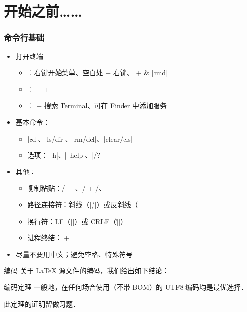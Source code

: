 \section{开始之前……}

\begin{frame}[fragile]
\frametitle{命令行基础}
\begin{itemize}
  \item 打开终端

    \begin{itemize}
      \item \faWindows{}：右键开始菜单、空白处  + 右键、 +  \& |cmd|
      \item \faLinux{}： +  + 
      \item \faApple{}： +  搜索 Terminal、可在 Finder 中添加服务
    \end{itemize}

  \item 基本命令：

    \begin{itemize}
      \item |cd|、|ls/dir|、|rm/del|、|clear/cls|
      \item 选项：|-h|、|--help|、|/?|
    \end{itemize}

  \item 其他：

    \begin{itemize}
      \item 复制粘贴：/ + 、/ + /、
      \item 路径连接符：斜线（|/|）或反斜线（|\|）
      \item 换行符：LF（|\n|）或 CRLF（|\r\n|）
      \item 进程终结： + 
    \end{itemize} \pause

  \item \alert{尽量不要用中文；避免空格、特殊符号}
\end{itemize}
\end{frame}

\begin{frame}{编码}
关于 \LaTeX{} 源文件的编码，我们给出如下结论：\pause
\begin{alertblock}{编码定理}
  一般地，在任何场合使用（不带 BOM）的 \alert{UTF\CASE{-}8} 编码均是最优选择．
\end{alertblock} \pause
此定理的证明留做习题．
\end{frame}
